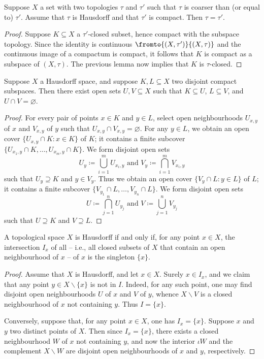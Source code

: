 \begin{prp}
	Suppose $X$ a set with two topologies $\tau$ and $\tau'$ such that $\tau$ is coarser than (or equal to) $\tau'$.
	Assume that $\tau$ is Hausdorff and that $\tau'$ is compact.
		Then $\tau=\tau'$.
	\begin{proof}
		Suppose $K\subseteq X$ a $\tau'$-closed subset, hence compact with the subspace topology.
		Since the identity is continuous $\fromto{(X,\tau')}{(X,\tau)}$ and the continuous image of a compactum is compact, it follows that $K$ is compact as a subspace of $(X,\tau)$.
		The previous lemma now implies that $K$ is $\tau$-closed.
	\end{proof}
\end{prp}

\begin{prp}
	Suppose $X$ a Hausdorff space, and
	suppose $K,L\subseteq X$ two disjoint compact subspaces.
	Then there exist open sets $U,V\subseteq X$ such that $K\subseteq U$, $L\subseteq V$, and $U\cap V=\varnothing$.
\end{prp}

\begin{proof}
	For every pair of points $x\in K$ and $y\in L$, select open neighbourhoods $U_{x,y}$ of $x$ and $V_{x,y}$ of $y$ such that $U_{x,y}\cap V_{x,y}=\varnothing$.
	For any $y\in L$, we obtain an open cover $\{U_{x,y}\cap K : x\in K\}$ of $K$;
	it contains a finite subcover $\{U_{x_1,y}\cap K,\dots,U_{x_m,y}\cap K\}$.
	We form disjoint open sets
	\[
		U_y\coloneq\bigcup_{i=1}^mU_{x_i,y}\text{ and }V_y\coloneq\bigcap_{i=1}^mV_{x_i,y}
	\]
	such that $U_y\supseteq K$ and $y\in V_y$.
	Thus we obtain an open cover $\{V_y\cap L : y\in L\}$ of $L$;
	it contains a finite subcover $\{V_{y_1}\cap L,\dots,V_{y_n}\cap L\}$.
	We form disjoint open sets
	\[
		U\coloneq\bigcap_{j=1}^nU_{y_j}\text{ and }V\coloneq\bigcup_{j=1}^nV_{y_j}
	\]
	such that $U\supseteq K$ and $V\supseteq L$.
\end{proof}

\begin{prp}
	A topological space $X$ is Hausdorff if and only if, for any point $x\in X$, the intersection $I_x$ of all  -- i.e., all closed subsets of $X$ that contain an open neighbourhood of $x$ -- of $x$ is the singleton $\{x\}$.
\end{prp}

\begin{proof}
	Assume that $X$ is Hausdorff, and let $x\in X$.
	Surely $x\in I_x$, and we claim that any point $y\in X\smallsetminus\{x\}$ is not in $I$.
	Indeed, for any such point, one may find disjoint open neighbourhoods $U$ of $x$ and $V$ of $y$, whence $X \smallsetminus V$ is a closed neighbourhood of $x$ not containing $y$.
	Thus $I=\{x\}$.

	Conversely, suppose that, for any point $x\in X$, one has $I_x=\{x\}$.
	Suppose $x$ and $y$ two distinct points of $X$.
	Then since $I_x=\{x\}$, there exists a closed neighbourhood $W$ of $x$ not containing $y$, and now the interior $\iota W$ and the complement $X \smallsetminus W$ are disjoint open neighbourhoods of $x$ and $y$, respectively.
\end{proof}

